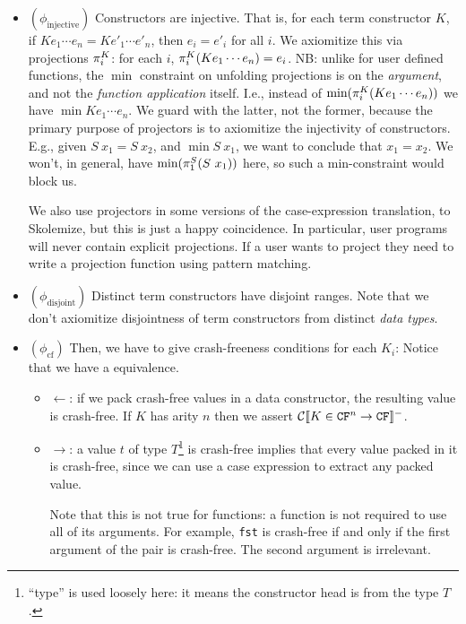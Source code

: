 \documentclass[preprint]{sigplanconf}
\begin{document}
\begin{itemize}
\item $(\phi_\text{injective})$ Constructors are injective.  That is,
  for each term constructor $K$, if $K e_1 \cdots e_n = K e'_1 \cdots
  e'_n$, then $e_i = e'_i$ for all $i$.  We axiomitize this via
  projections $\pi_{i}^{K}$: for each $i$, $\pi_{i}^{K}(K e_1 \cdots
  e_n) = e_i$.  NB: unlike for user defined functions, the $\min{}$
  constraint on unfolding projections is on the \emph{argument}, and
  not the \emph{function application} itself.  I.e., instead of
  $\mbox{min}(\pi_{i}^{K}(K e_1 \cdots e_n))$ we have $\min{K e_1 \cdots
    e_n}$.  We guard with the latter, not the former, because the
  primary purpose of projectors is to axiomitize the injectivity of
  constructors.  E.g., given $S~x_1 = S~x_2$, and $\min{S~x_1}$, we
  want to conclude that $x_1 = x_2$.  We won't, in general, have
  $\mbox{min}(\pi_{1}^{S}(S~x_1))$ here, so such a min-constraint would
  block us.

  We also use projectors in some versions of the case-expression
  translation, to Skolemize, but this is just a happy coincidence.  In
  particular, user programs will never contain explicit projections.
  If a user wants to project they need to write a projection function
  using pattern matching.
\item $(\phi_\text{disjoint})$ Distinct term constructors have
  disjoint ranges.  Note that we don't axiomitize disjointness of term
  constructors from distinct \emph{data types}.
\item $(\phi_\text{cf})$ Then, we have to give crash-freeness conditions for each $K_i$:
  Notice that we have a equivalence.
  \begin{itemize}
  \item $\gets$: if we pack crash-free values in a data constructor,
    the resulting value is crash-free.  If $K$ has arity $n$
    then we assert $\mathcal{C} \llbracket K \in \texttt{CF}^n \to \texttt{CF} \rrbracket^-$.

  \item $\to$: a value $t$ of type $T$\footnote{
    ``type'' is used loosely here: it means the constructor 
      head is from the type $T$.
    } is crash-free implies
    that every value packed in it is crash-free, since we can use
    a case expression to extract any packed value.

  Note that this is not true for functions: a function is not required
  to use all of its arguments. For example, \texttt{fst} is crash-free if and only
  if the first argument of the pair is crash-free. The second argument
  is irrelevant.


\end{itemize}
\end{itemize}
\end{document}
